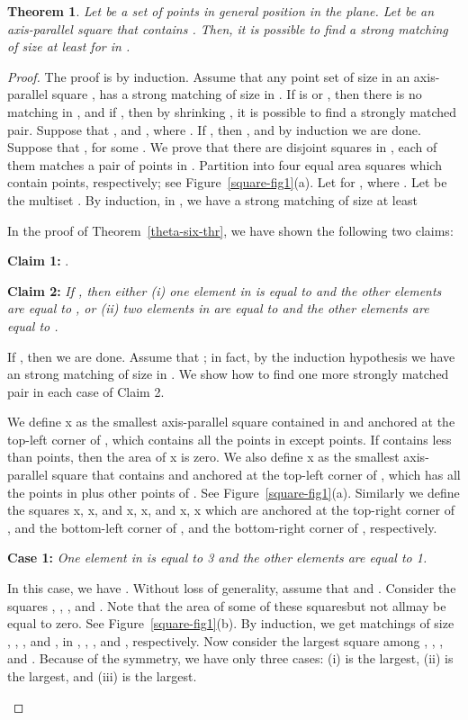 \documentclass[11pt,a4paper]{article}
\newtheorem{theorem}{Theorem}
\begin{document}
\label{infty-Delaunay-section}
\begin{theorem}
\label{infty-Delaunay-thr}
Let  be a set of  points in general position in the plane. Let  be an axis-parallel square that contains . Then, it is possible to find a strong matching of size at least  for  in .
\end{theorem}

\begin{proof}
The proof is by induction. Assume that any point set of size  in an axis-parallel square , has a strong matching of size  in . If  is  or , then there is no matching in , and if , then by shrinking , it is possible to find a strongly matched pair. Suppose that , and , where . If , then 
, and by
induction we are done. Suppose that , for some . We prove that there are  disjoint squares in ,
each of them matches a pair of points in . Partition  into four equal area squares  which contain  points, respectively; see Figure~\ref{square-fig1}(a). Let  for , where . Let  be the multiset . 
By induction, in , we have a strong matching of size at least
 

In the proof of Theorem~\ref{theta-six-thr}, we have shown the following two claims:

{\bf Claim 1:} {.}

{\bf Claim 2:} {\em If , then either (i) one element in  is equal to  and the other elements are equal to , or (ii) two elements in  are equal to  and the other elements are equal to .}


If , then we are done. Assume that ; in fact, by the induction hypothesis we have an strong matching of size  in . 
We show how to find one more strongly matched pair in each case of Claim 2.

We define x as the smallest axis-parallel square contained in  and anchored at the top-left corner of , which contains all the points in  except  points. If  contains less than  points, then the area of x is zero. We also define x as the smallest axis-parallel square that contains  and anchored at the top-left corner of , which has all the points in  plus  other points of . See Figure~\ref{square-fig1}(a). Similarly we define the squares x, x, and x, x, and x, x which are anchored at the top-right corner of , and the bottom-left corner of , and the bottom-right corner of , respectively.

{\bf Case 1:} {\em One element in  is equal to 3 and the other elements are equal to 1.}

In this case, we have . Without loss of generality, assume that  and . Consider the squares , , , and . Note that the area of some of these squares\textemdash but not all\textemdash may be
equal to zero. See Figure~\ref{square-fig1}(b). By induction, we get matchings of size , , , and , in 
, , , and , respectively. Now consider the largest square among , , , and . Because of the symmetry, we have only three cases: (i)  is the largest, (ii)  is the largest, and (iii)  is the largest.
\begin{figure}[htb]
  \centering
\setlength{\tabcolsep}{0in}
  

\end{figure}
\end{proof}
\end{document}
